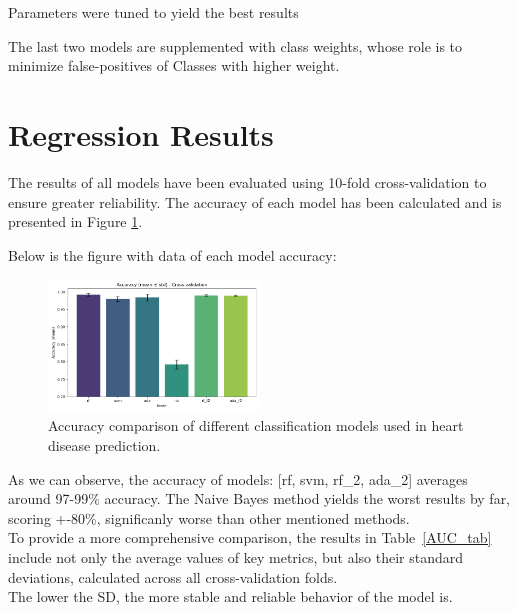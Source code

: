 \documentclass[conference]{IEEEtran}
\begin{document}
Parameters were tuned to yield the best results %

The last two models are supplemented with class weights, whose role is to minimize false-positives of Classes with higher weight.




\section{Regression Results}

The results of all models have been evaluated using 10-fold cross-validation to ensure greater reliability.
The accuracy of each model has been calculated and is presented in Figure \ref{fig:accuracy}. 


Below is the figure with data of each model accuracy:
\begin{figure}[H]%
    \centering
    \includegraphics[width=0.5\textwidth]{../src/plots/accuracy_cv_plot.png}
    \caption{Accuracy comparison of different classification models used in heart disease prediction.}
    \label{fig:accuracy}
\end{figure}

As we can observe, the accuracy of models: [rf, svm, rf\_2, ada\_2] averages around 97-99\% accuracy.
The Naive Bayes method yields the worst results by far, scoring +-80\%, significanly worse than other
mentioned methods.
\\ 

To provide a more comprehensive comparison, the results in Table~\ref{AUC_tab} include not only the average values of key metrics,  
but also their standard deviations, calculated across all cross-validation folds. \\
The lower the SD, the more stable and reliable behavior of the model is.
\end{document}
